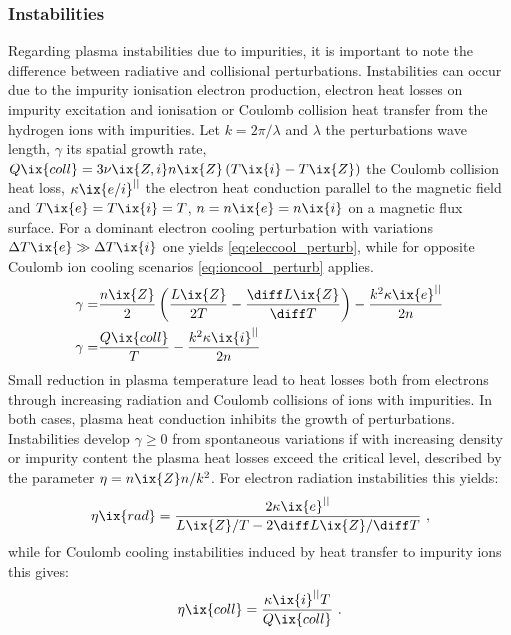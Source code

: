                 \subsubsection*{Instabilities}%
%
                Regarding plasma instabilities due to impurities, it is important to note the difference between radiative and collisional perturbations. Instabilities can occur due to the impurity ionisation electron production, electron heat losses on impurity excitation and ionisation or Coulomb collision heat transfer from the hydrogen ions with impurities. Let $k=2\pi/\lambda$ and $\lambda$ the perturbations wave length, $\gamma$ its spatial growth rate, $Q\ix{coll}=3\nu\ix{Z,i}n\ix{Z}\left(T\ix{i}-T\ix{Z}\right)$ the Coulomb collision heat loss,  $\kappa\ix{e/i}^{||}$ the electron heat conduction parallel to the magnetic field and $T\ix{e}=T\ix{i}=T$, $n=n\ix{e}=n\ix{i}$ on a magnetic flux surface. For a dominant electron cooling perturbation with variations $\Delta T\ix{e}\gg\Delta T\ix{i}$ one yields \cref{eq:eleccool_perturb}, while for opposite Coulomb ion cooling scenarios \cref{eq:ioncool_perturb} applies\cite{Tokar2010}.%
%
                \begin{align}%
                    \gamma=&\frac{n\ix{Z}}{2}\left(\frac{L\ix{Z}}{2T}-\frac{\diff L\ix{Z}}{\diff T}\right)-\frac{k^{2}\kappa\ix{e}^{||}}{2n}\label{eq:eleccool_perturb}\\%
                    \gamma=&\frac{Q\ix{coll}}{T}-\frac{k^{2}\kappa\ix{i}^{||}}{2n}\label{eq:ioncool_perturb}%
                \end{align}%
%
                Small reduction in plasma temperature lead to heat losses both from electrons through increasing radiation and Coulomb collisions of ions with impurities. In both cases, plasma heat conduction inhibits the growth of perturbations. Instabilities develop $\gamma\geq0$ from spontaneous variations if with increasing density or impurity content the plasma heat losses exceed the critical level, described by the parameter $\eta=n\ix{Z}n/k^{2}$. For electron radiation instabilities this yields\cite{Tokar2010}:%
%
                \begin{align}%
                    \eta\ix{rad}=\frac{2\kappa\ix{e}^{||}}{L\ix{Z}/T - 2\diff L\ix{Z}/\diff T}\,\,,\nonumber%
                \end{align}%
%
                while for Coulomb cooling instabilities induced by heat transfer to impurity ions this gives:%
%
                \begin{align}%
                    \eta\ix{coll}=\frac{\kappa\ix{i}^{||}T}{Q\ix{coll}}\,\,.\nonumber%
                \end{align}%
